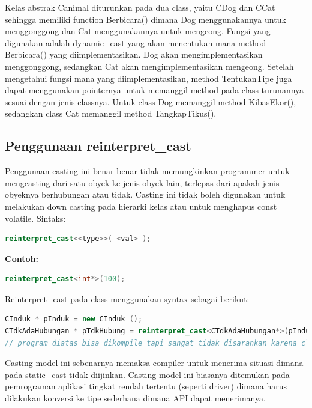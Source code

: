 Kelas abstrak Canimal diturunkan pada dua class, yaitu CDog dan CCat
sehingga memiliki function Berbicara() dimana Dog menggunakannya untuk
menggonggong dan Cat menggunakannya untuk mengeong. Fungsi yang
digunakan adalah dynamic\_cast yang akan menentukan mana method
Berbicara() yang diimplementasikan. Dog akan mengimplementasikan
menggonggong, sedangkan Cat akan mengimplementasikan mengeong. Setelah
mengetahui fungsi mana yang diimplementasikan, method TentukanTipe juga
dapat menggunakan pointernya untuk memanggil method pada class
turunannya sesuai dengan jenis classnya. Untuk class Dog memanggil
method KibasEkor(), sedangkan class Cat memanggil method TangkapTikus().

\subsection{Penggunaan reinterpret\_cast}\label{penggunaan-reinterpretux5fcast}

Penggunaan casting ini benar-benar tidak memungkinkan programmer untuk
mengcasting dari satu obyek ke jenis obyek lain, terlepas dari apakah
jenis obyeknya berhubungan atau tidak. Casting ini tidak boleh digunakan
untuk melakukan down casting pada hierarki kelas atau untuk menghapus
const volatile. Sintaks:

\begin{lstlisting}[language=c++, numbers=none]
reinterpret_cast<<type>>( <val> );
\end{lstlisting}

\textbf{Contoh:}

\begin{lstlisting}[language=c++, numbers=none]
reinterpret_cast<int*>(100);
\end{lstlisting}

Reinterpret\_cast pada class menggunakan syntax sebagai berikut:

\begin{lstlisting}[language=c++, numbers=none]
CInduk * pInduk = new CInduk ();
CTdkAdaHubungan * pTdkHubung = reinterpret_cast<CTdkAdaHubungan*>(pInduk);
// program diatas bisa dikompile tapi sangat tidak disarankan karena class CtdkAdaHubungan bukanlah turunan dari Cinduk.
\end{lstlisting}

Casting model ini sebenarnya memaksa compiler untuk menerima situasi
dimana pada static\_cast tidak diijinkan. Casting model ini biasanya
ditemukan pada pemrograman aplikasi tingkat rendah tertentu (seperti
driver) dimana harus dilakukan konversi ke tipe sederhana dimana API
dapat menerimanya.

